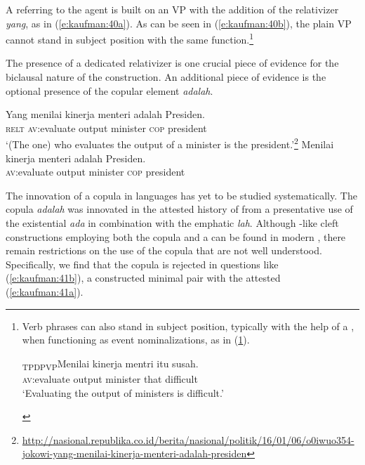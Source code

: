\documentclass[output=paper]{langsci/langscibook}
\begin{document}
\noindent
A  referring to the agent is built on an  VP with the addition of the relativizer \textit{yang}, as in (\ref{e:kaufman:40a}). As can be seen in (\ref{e:kaufman:40b}), the plain VP cannot stand in subject position with the same function.\footnote{Verb phrases can also stand in subject position, typically with the help of a , when functioning as event nominalizations, as in (\ref{e:kaufman:40.5}).  

\begin{exe}
	\ex\label{e:kaufman:40.5}
	\gll \textsubscript{TP}{\ob}\textsubscript{DP}{\ob}\textsubscript{VP}{\ob}Menilai kinerja mentri{\cb} itu{\cb} susah{\cb}.\\
	\phantom{\textsubscript{TP}[\textsubscript{DP}[\textsubscript{VP}[}\textsc{av:}evaluate output minister that difficult\\
	\trans`Evaluating the output of ministers is difficult.' 
\end{exe}}

The presence of a dedicated relativizer is one crucial piece of evidence for the biclausal nature of the construction. An additional piece of evidence is the optional presence of the copular element \textit{adalah}.

\begin{exe}
	\ex\label{e:kaufman:40}
	\begin{xlist}
		\ex\label{e:kaufman:40a}
        \gll Yang menilai kinerja menteri adalah Presiden.\\
		\textsc{relt} \textsc{av:}evaluate output minister \textsc{cop} president\\
		\glt `(The one) who evaluates the output of a minister is the president.'\footnote{\url{http://nasional.republika.co.id/berita/nasional/politik/16/01/06/o0iwuo354-jokowi-yang-menilai-kinerja-menteri-adalah-presiden}}
		\ex\label{e:kaufman:40b}
        \gll {\USStar}Menilai kinerja menteri adalah Presiden.\\
		\phantom{*}\textsc{av:}evaluate output minister \textsc{cop} president\\
	\end{xlist}
\end{exe}

\noindent
The innovation of a copula in  languages has yet to be studied systematically. The copula \textit{adalah} was innovated in the attested history of  from a presentative use of the existential \textit{ada} in combination with the emphatic \textit{lah}. Although -like cleft constructions employing both the copula and a  can be found in modern , there remain restrictions on the use of the copula that are not well understood. Specifically, we find that the copula is rejected in questions like (\ref{e:kaufman:41b}), a constructed minimal pair with the attested (\ref{e:kaufman:41a}). 
\end{document}
